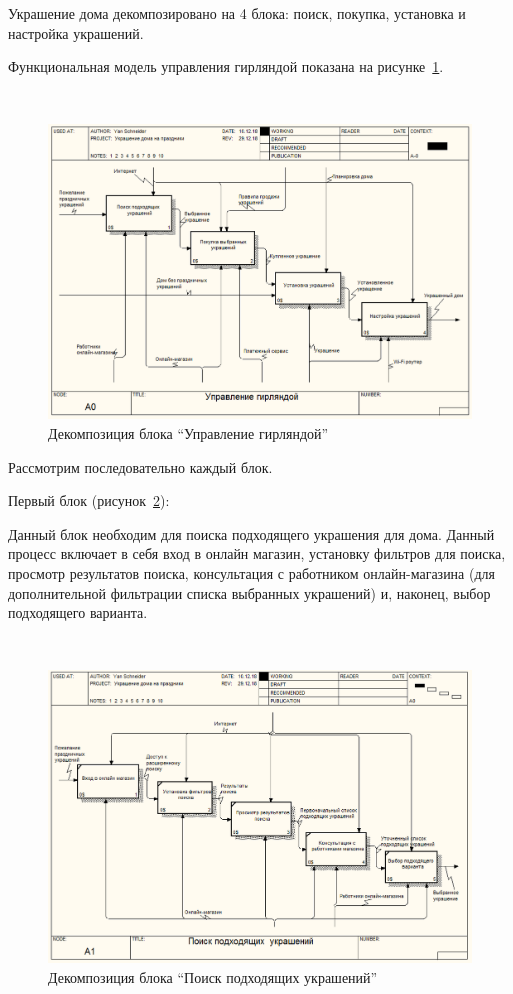 Украшение дома декомпозировано на 4 блока: поиск, покупка, установка и настройка украшений.

Функциональная модель управления гирляндой показана на рисунке~\ref{fig:develop:functionalModel:a0_decoration}.

~
\begin{figure}[H]
\centering
	\includegraphics[scale=0.45]{figures/functionalModel/a0_decoration.jpg}
	\caption{Декомпозиция блока ``Управление гирляндой''}
	\label{fig:develop:functionalModel:a0_decoration}
\end{figure}

Рассмотрим последовательно каждый блок.

Первый блок (рисунок~\ref{fig:develop:functionalModel:a1_search}):

Данный блок необходим для поиска подходящего украшения для дома. Данный процесс включает в себя вход в онлайн магазин, установку фильтров для поиска, просмотр результатов поиска, консультация с работником онлайн-магазина (для дополнительной фильтрации списка выбранных украшений) и, наконец, выбор подходящего варианта.

 ~
\begin{figure}[H]
\centering
	\includegraphics[scale=0.45]{figures/functionalModel/a1_search.jpg}
	\caption{Декомпозиция блока ``Поиск подходящих украшений''}
	\label{fig:develop:functionalModel:a1_search}
\end{figure}

